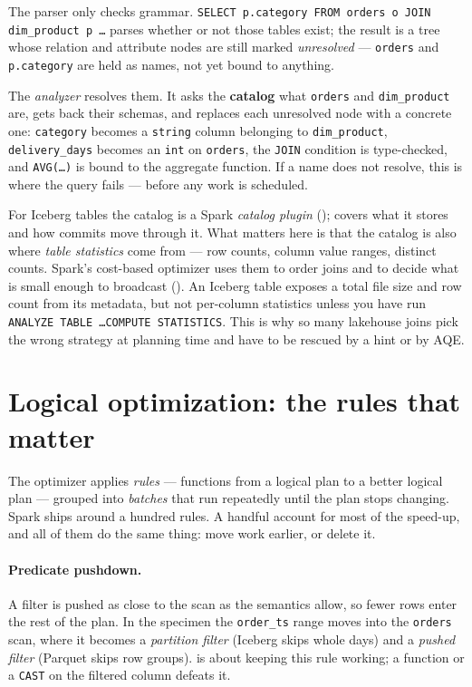 The parser only checks grammar. \texttt{SELECT p.category FROM orders o JOIN
dim\_product p \dots} parses whether or not those tables exist; the result is a
tree whose relation and attribute nodes are still marked \emph{unresolved} ---
\texttt{orders} and \texttt{p.category} are held as names, not yet bound to
anything.

The \emph{analyzer} resolves them. It asks the \textbf{catalog} what
\texttt{orders} and \texttt{dim\_product} are, gets back their schemas, and
replaces each unresolved node with a concrete one: \texttt{category} becomes a
\texttt{string} column belonging to \texttt{dim\_product}, \texttt{delivery\_days}
becomes an \texttt{int} on \texttt{orders}, the \texttt{JOIN} condition is
type-checked, and \texttt{AVG(\dots)} is bound to the aggregate function. If a
name does not resolve, this is where the query fails --- before any work is
scheduled.

For Iceberg tables the catalog is a Spark \emph{catalog plugin}
();  covers
what it stores and how commits move through it. What matters here is that the
catalog is also where \emph{table statistics} come from --- row counts, column
value ranges, distinct counts. Spark's cost-based optimizer uses them to order
joins and to decide what is small enough to broadcast (). An
Iceberg table exposes a total file size and row count from its metadata, but not
per-column statistics unless you have run \texttt{ANALYZE TABLE \dots COMPUTE
STATISTICS}. This is why so many lakehouse joins pick the wrong strategy at
planning time and have to be rescued by a hint or by AQE.

\section{Logical optimization: the rules that matter}
\label{sec:catalyst-rules}

The optimizer applies \emph{rules} --- functions from a logical plan to a better
logical plan --- grouped into \emph{batches} that run repeatedly until the plan
stops changing. Spark ships around a hundred rules. A handful account for most of
the speed-up, and all of them do the same thing: move work earlier, or delete it.

\paragraph{Predicate pushdown.} A filter is pushed as close to the scan as the
semantics allow, so fewer rows enter the rest of the plan. In the specimen the
\texttt{order\_ts} range moves into the \texttt{orders} scan, where it becomes a
\emph{partition filter} (Iceberg skips whole days) and a \emph{pushed filter}
(Parquet skips row groups).  is about keeping this rule
working; a function or a \texttt{CAST} on the filtered column defeats it.

